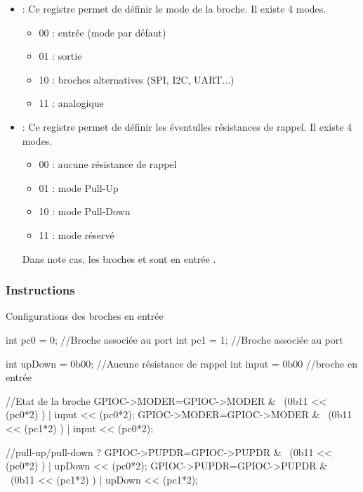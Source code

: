 \begin{itemize}

\item {} : Ce registre permet de définir le mode de la broche. Il existe 4 modes.

  \begin{itemize}
    \item 00 : entrée  (mode par défaut)
    \item 01 : sortie
    \item 10 : broches alternatives (SPI, I2C, UART...)
    \item 11 : analogique
  \end{itemize}

 \item {} : Ce registre permet de définir les éventulles résistances de rappel. Il existe 4 modes.

  \begin{itemize}
    \item 00 : aucune résistance de rappel
    \item 01 : mode Pull-Up
    \item 10 : mode Pull-Down
    \item 11 : mode réservé
  \end{itemize}

  Dans note cas, les broches  et  sont en entrée .

\end{itemize}

\subsubsection{Instructions}

  \begin{Cpp}{Configurations des broches en entrée}

  int pc0 = 0;                //Broche associée au port
  int pc1 = 1;                //Broche associée au port

  int upDown = 0b00;   //Aucune résistance de rappel
  int input = 0b00     //broche en entrée

  //Etat de la broche
  GPIOC->MODER=GPIOC->MODER & ~(0b11 << (pc0*2) ) | input << (pc0*2); 
  GPIOC->MODER=GPIOC->MODER & ~(0b11 << (pc1*2) ) | input << (pc0*2);

  //pull-up/pull-down ?
  GPIOC->PUPDR=GPIOC->PUPDR & ~(0b11 << (pc0*2) ) | upDown << (pc0*2);
  GPIOC->PUPDR=GPIOC->PUPDR & ~(0b11 << (pc1*2) ) | upDown << (pc1*2);

\end{Cpp}

